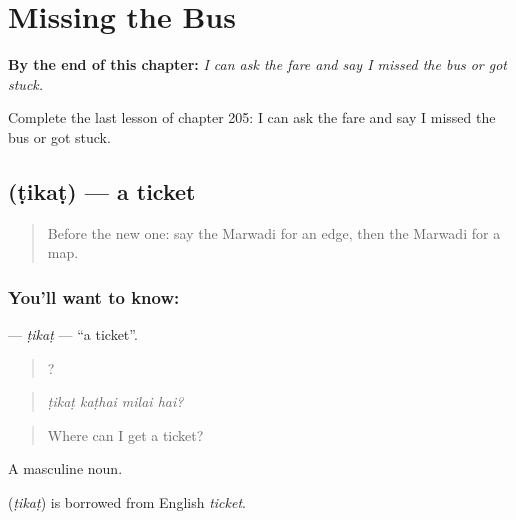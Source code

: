 
\chapter{Missing the Bus}
\label{ch:mw-missing-the-bus}

\begin{chapteropening}
\textbf{By the end of this chapter:} \emph{I can ask the fare and say I missed the bus or got stuck.}

Complete the last lesson of chapter 205: I can ask the fare and say I missed the bus or got stuck.
\end{chapteropening}

\section[\texorpdfstring{\mw{टिकट} (ṭikaṭ)}{टिकट (ṭikaṭ)}]{ (ṭikaṭ) — a ticket}

\label{lesson:MW-C205-tikat}



\begin{quote}
Before the new one: say the Marwadi for an edge, then the Marwadi for a map.
\end{quote}

\subsection*{You'll want to know: }
\textbf{} — \emph{ṭikaṭ} — \textquotedblleft{}a ticket\textquotedblright{}.

\begin{quote}
   ?
\end{quote}

\begin{quote}
\emph{ṭikaṭ kaṭhai milai hai?}
\end{quote}

\begin{quote}
Where can I get a ticket?
\end{quote}

A masculine noun.

\begin{cousinweb}
\textbf{} (\emph{ṭikaṭ}) is borrowed from English \emph{ticket}.
\end{cousinweb}

